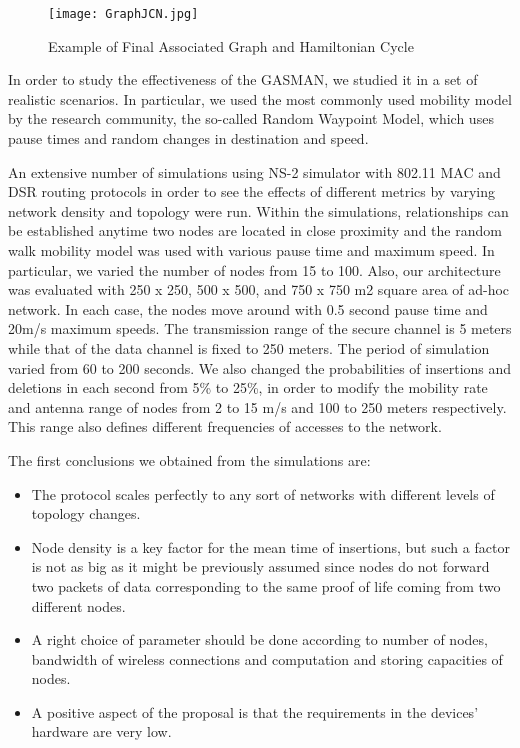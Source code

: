 \documentclass{article}
\begin{document}
\begin{figure}\centering
     \texttt{[image: GraphJCN.jpg]}\caption{Example of Final Associated Graph and Hamiltonian Cycle} \label{fig:Graph}
  \vspace{-0.2cm}
\end{figure}


In order to study the effectiveness of the GASMAN, we studied it in a set of realistic scenarios. In particular, we used the most commonly used mobility model by the research community, the so-called Random Waypoint Model, which uses pause times and random changes in destination and speed.

An extensive number of simulations using NS-2 simulator with 802.11 MAC and DSR
routing protocols in order to see the effects of different metrics by varying network density and topology were run. Within the simulations, relationships can be established anytime two nodes are located in close proximity and the random walk mobility model was used with various pause time and maximum speed. In particular, we varied the number of nodes from 15 to 100. Also, our architecture was evaluated with 250 x 250, 500 x 500, and 750 x 750 m2 square area of ad-hoc network. In each case, the nodes move around with 0.5
second pause time and 20m/s maximum speeds. The transmission range of the
secure channel is 5 meters while that of the data channel is fixed to 250 meters.
The period of simulation varied from 60 to 200 seconds. We also changed the
probabilities of insertions and deletions in each second from 5\%
to 25\%, in order to modify the mobility rate and antenna range of
nodes from 2 to 15 m/s and 100 to 250 meters respectively. This
range also defines different frequencies of accesses to the
network.

The first conclusions we obtained from the simulations
are:
\begin{itemize}
\item The  protocol  scales perfectly to any sort of networks with different levels of topology changes.
\item Node density is a key factor for the mean time of insertions, but such a factor is not as big as it might be
 previously assumed since nodes do not forward two packets of data corresponding to the same proof of life
 coming from two different nodes.
\item A right choice of parameter  should be done according to number of nodes, bandwidth of wireless connections and
computation and storing capacities of nodes.
\item  A positive aspect of the proposal is that the requirements in the devices' hardware are very low.
\end{itemize}
\end{document}
